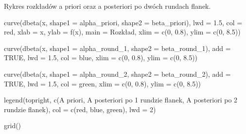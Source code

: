 \documentclass[
]{article}
\newenvironment{Shaded}{\begin{snugshade}}{\end{snugshade}}
\newcommand{\AttributeTok}[1]{\textcolor[rgb]{0.77,0.63,0.00}{#1}}
\newcommand{\ConstantTok}[1]{\textcolor[rgb]{0.00,0.00,0.00}{#1}}
\newcommand{\DecValTok}[1]{\textcolor[rgb]{0.00,0.00,0.81}{#1}}
\newcommand{\FloatTok}[1]{\textcolor[rgb]{0.00,0.00,0.81}{#1}}
\newcommand{\FunctionTok}[1]{\textcolor[rgb]{0.00,0.00,0.00}{#1}}
\newcommand{\NormalTok}[1]{#1}
\newcommand{\StringTok}[1]{\textcolor[rgb]{0.31,0.60,0.02}{#1}}
\begin{document}
Rykres rozkładów a priori oraz a posteriori po dwóch rundach flanek.

\begin{Shaded}
\begin{Highlighting}[]
\FunctionTok{curve}\NormalTok{(}\FunctionTok{dbeta}\NormalTok{(x, }\AttributeTok{shape1 =}\NormalTok{ alpha\_priori, }\AttributeTok{shape2 =}\NormalTok{ beta\_priori),}
      \AttributeTok{lwd =} \FloatTok{1.5}\NormalTok{, }\AttributeTok{col =} \StringTok{\textquotesingle{}red\textquotesingle{}}\NormalTok{, }\AttributeTok{xlab =} \StringTok{\textquotesingle{}x\textquotesingle{}}\NormalTok{, }\AttributeTok{ylab =} \StringTok{\textquotesingle{}f(x)\textquotesingle{}}\NormalTok{,}
      \AttributeTok{main =} \StringTok{\textquotesingle{}Rozkład\textquotesingle{}}\NormalTok{, }\AttributeTok{xlim =} \FunctionTok{c}\NormalTok{(}\DecValTok{0}\NormalTok{, }\FloatTok{0.8}\NormalTok{), }\AttributeTok{ylim =} \FunctionTok{c}\NormalTok{(}\DecValTok{0}\NormalTok{, }\FloatTok{8.5}\NormalTok{))}

\FunctionTok{curve}\NormalTok{(}\FunctionTok{dbeta}\NormalTok{(x, }\AttributeTok{shape1 =}\NormalTok{ alpha\_round\_1, }\AttributeTok{shape2 =}\NormalTok{ beta\_round\_1),}
      \AttributeTok{add =} \ConstantTok{TRUE}\NormalTok{, }\AttributeTok{lwd =} \FloatTok{1.5}\NormalTok{, }\AttributeTok{col =} \StringTok{\textquotesingle{}blue\textquotesingle{}}\NormalTok{, }\AttributeTok{xlim =} \FunctionTok{c}\NormalTok{(}\DecValTok{0}\NormalTok{, }\FloatTok{0.8}\NormalTok{),}
      \AttributeTok{ylim =} \FunctionTok{c}\NormalTok{(}\DecValTok{0}\NormalTok{, }\FloatTok{8.5}\NormalTok{))}

\FunctionTok{curve}\NormalTok{(}\FunctionTok{dbeta}\NormalTok{(x, }\AttributeTok{shape1 =}\NormalTok{ alpha\_round\_2, }\AttributeTok{shape2 =}\NormalTok{ beta\_round\_2), }\AttributeTok{add =} \ConstantTok{TRUE}\NormalTok{,}
      \AttributeTok{lwd =} \FloatTok{1.5}\NormalTok{, }\AttributeTok{col =} \StringTok{\textquotesingle{}green\textquotesingle{}}\NormalTok{, }\AttributeTok{xlim =} \FunctionTok{c}\NormalTok{(}\DecValTok{0}\NormalTok{, }\FloatTok{0.8}\NormalTok{), }\AttributeTok{ylim =} \FunctionTok{c}\NormalTok{(}\DecValTok{0}\NormalTok{, }\FloatTok{8.5}\NormalTok{))}

\FunctionTok{legend}\NormalTok{(}\StringTok{\textquotesingle{}topright\textquotesingle{}}\NormalTok{, }\FunctionTok{c}\NormalTok{(}\StringTok{\textquotesingle{}A priori\textquotesingle{}}\NormalTok{, }\StringTok{\textquotesingle{}A posteriori po 1 rundzie flanek\textquotesingle{}}\NormalTok{,}
      \StringTok{\textquotesingle{}A posteriori po 2 rundzie flanek\textquotesingle{}}\NormalTok{), }\AttributeTok{col =} \FunctionTok{c}\NormalTok{(}\StringTok{\textquotesingle{}red\textquotesingle{}}\NormalTok{, }\StringTok{\textquotesingle{}blue\textquotesingle{}}\NormalTok{, }\StringTok{\textquotesingle{}green\textquotesingle{}}\NormalTok{), }\AttributeTok{lwd =} \DecValTok{2}\NormalTok{)}

\FunctionTok{grid}\NormalTok{()}
\end{Highlighting}
\end{Shaded}
\end{document}

